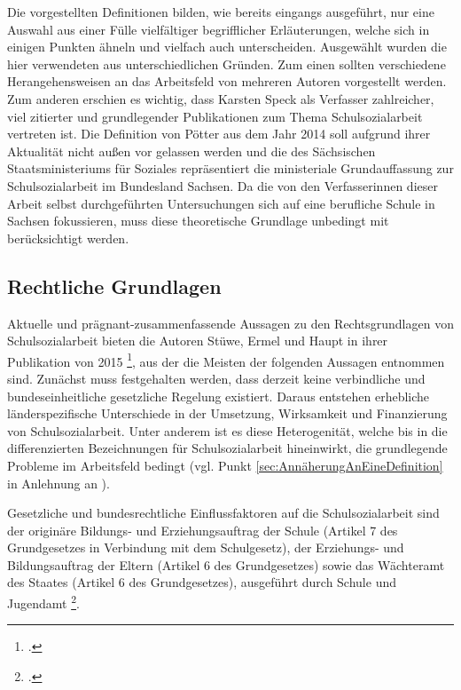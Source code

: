 Die vorgestellten Definitionen bilden, wie bereits eingangs ausgeführt, nur eine Auswahl aus einer Fülle vielfältiger begrifflicher Erläuterungen, welche sich in einigen Punkten ähneln und vielfach auch unterscheiden. Ausgewählt wurden die hier verwendeten aus unterschiedlichen Gründen. Zum einen sollten verschiedene Herangehensweisen an das Arbeitsfeld von mehreren Autoren vorgestellt werden. Zum anderen erschien es wichtig, dass Karsten Speck als Verfasser zahlreicher, viel zitierter und grundlegender Publikationen zum Thema Schulsozialarbeit vertreten ist. Die Definition von Pötter aus dem Jahr 2014 soll aufgrund ihrer Aktualität nicht außen vor gelassen werden und die des Sächsischen Staatsministeriums für Soziales repräsentiert die ministeriale Grundauffassung zur Schulsozialarbeit im Bundesland Sachsen. Da die von den Verfasserinnen dieser Arbeit selbst durchgeführten Untersuchungen sich auf eine berufliche Schule in Sachsen fokussieren, muss diese theoretische Grundlage unbedingt mit berücksichtigt werden. 

\subsection{Rechtliche Grundlagen}
\label{sec:RechtlicheGrundlagen}

Aktuelle und prägnant-zusammenfassende Aussagen zu den Rechtsgrundlagen von Schulsozialarbeit bieten die Autoren Stüwe, Ermel und Haupt in ihrer Publikation von 2015 \footcite[24ff]{Stuewe2015}, aus der die Meisten der folgenden Aussagen entnommen sind. Zunächst muss festgehalten werden, dass derzeit keine verbindliche und bundeseinheitliche gesetzliche Regelung existiert. Daraus entstehen erhebliche länderspezifische Unterschiede in der Umsetzung, Wirksamkeit und Finanzierung von Schulsozialarbeit. Unter anderem ist es diese Heterogenität, welche bis in die differenzierten Bezeichnungen für Schulsozialarbeit hineinwirkt, die grundlegende Probleme im Arbeitsfeld bedingt (vgl. Punkt \ref{sec:AnnäherungAnEineDefinition} in Anlehnung an \cite[23]{Speck2007}).

Gesetzliche und bundesrechtliche Einflussfaktoren auf die Schulsozialarbeit sind der originäre Bildungs- und Erziehungsauftrag der Schule (Artikel 7 des Grundgesetzes in Verbindung mit dem Schulgesetz), der Erziehungs- und Bildungsauftrag der Eltern (Artikel 6 des Grundgesetzes) sowie das Wächteramt des Staates (Artikel 6 des Grundgesetzes), ausgeführt durch Schule und Jugendamt \footcite[vgl.][25]{Stuewe2015}.

